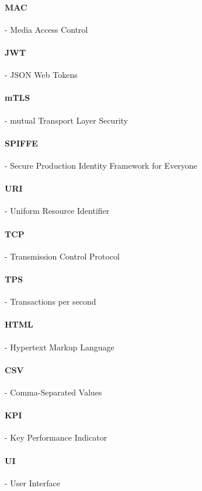 \paragraph{MAC} - Media Access Control

\paragraph{JWT} - JSON Web Tokens

\paragraph{mTLS} - mutual Transport Layer Security

\paragraph{SPIFFE} - Secure Production Identity Framework for Everyone

\paragraph{URI} - Uniform Resource Identifier

\paragraph{TCP} - Transmission Control Protocol

\paragraph{TPS} - Transactions per second

\paragraph{HTML} - Hypertext Markup Language

\paragraph{CSV} - Comma-Separated Values

\paragraph{KPI} - Key Performance Indicator

\paragraph{UI} - User Interface

